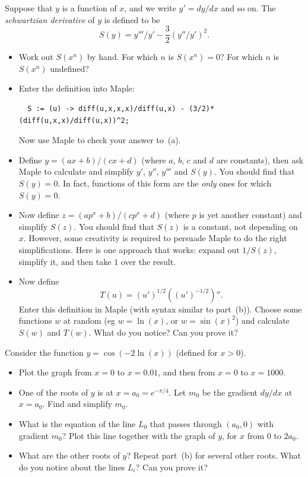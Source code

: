 \documentclass[a4paper,10pt]{amsbook}
\begin{document}
\begin{exercise}\label{ex-schwartzian}
 Suppose that $y$ is a function of $x$, and we write $y'=dy/dx$ and so
 on.  The \emph{schwartzian derivative} of $y$ is defined to be
 \[ S(y) = y'''/y' - \frac{3}{2}(y''/y')^2. \]
 \begin{itemize}
  \item[(a)] Work out $S(x^n)$ by hand.  For which $n$ is $S(x^n)=0$? 
   For which $n$ is $S(x^n)$ undefined? 
  \item[(b)] Enter the definition into Maple:
\begin{verbatim}
  S := (u) -> diff(u,x,x,x)/diff(u,x) - (3/2)*(diff(u,x,x)/diff(u,x))^2;
\end{verbatim}
   Now use Maple to check your answer to~(a). 
  \item[(c)] Define $y=(ax+b)/(cx+d)$ (where $a$, $b$, $c$ and $d$ are
   constants), then ask Maple to calculate and simplify $y'$, $y''$,
   $y'''$ and $S(y)$.  You should find that $S(y)=0$.  In fact,
   functions of this form are the \emph{only} ones for which $S(y)=0$. 
  \item[(d)] Now define $z=(ap^x+b)/(cp^x+d)$ (where $p$ is yet
   another constant) and simplify $S(z)$.  You should find that $S(z)$
   is a constant, not depending on $x$.  However, some creativity is
   required to persuade Maple to do the right simplifications.  Here
   is one approach that works: expand out $1/S(z)$, simplify it, and
   then take $1$ over the result. 
  \item[(e)] Now define 
   \[ T(u) = (u')^{1/2} ((u')^{-1/2})''. \] Enter this
   definition in Maple (with syntax similar to part~(b)). 
   Choose some functions $w$ at random (eg $w=\ln(x)$, or
   $w=\sin(x)^2$) and calculate $S(w)$ and $T(w)$.  What do
   you notice?  Can you prove it? 
 \end{itemize}
\end{exercise}

\begin{exercise}
 Consider the function $y=\cos(-2\ln(x))$ (defined for $x>0$).
 \begin{itemize}
  \item[(a)] Plot the graph from $x=0$ to $x=0.01$, and then from
   $x=0$ to $x=1000$.
  \item[(b)] One of the roots of $y$ is at $x=a_0=e^{-\pi/4}$.  Let
   $m_0$ be the gradient $dy/dx$ at $x=a_0$.  Find and simplify
   $m_0$.  
  \item[(c)] What is the equation of the line $L_0$ that passes
   through $(a_0,0)$ with gradient $m_0$?  Plot this line together
   with the graph of $y$, for $x$ from $0$ to $2a_0$.
  \item[(c)] What are the other roots of $y$?  Repeat part~(b) for
   several other roots.  What do you notice about the lines $L_i$?
   Can you prove it?
 \end{itemize}
\end{exercise}
\end{document}
